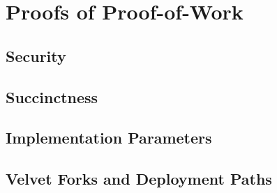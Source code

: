 \chapter{Proofs of Proof-of-Work}\label{chapter:work}

















\section{Security}
\section{Succinctness}
\section{Implementation Parameters}
\section{Velvet Forks and Deployment Paths}
